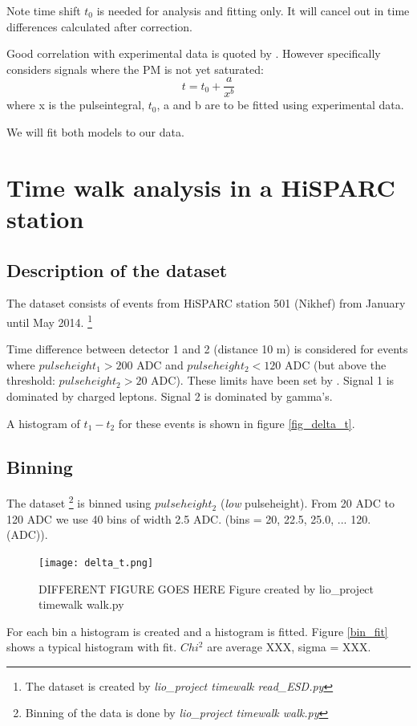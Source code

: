 \documentclass[a4paper,11pt]{article}
\begin{document}
Note time shift $t_0$ is needed for analysis and fitting only. It will cancel out in time differences calculated after correction.

Good correlation with experimental data is quoted by \cite{Brown:1983ka}. However \cite{Smith:2002} specifically considers signals where the PM is not yet saturated:
\begin{equation}
t = t_0 + \frac{a}{x^b}
\end{equation}
where x is the pulseintegral, $t_0$, a and b are to be fitted using experimental data.

We will fit both models to our data.

\section{Time walk analysis in a HiSPARC station}
\subsection{Description of the dataset}
The dataset consists of events from HiSPARC station 501 (Nikhef) from January until May 2014. \footnote{The dataset is created by {\textit{lio\_project timewalk read\_ESD.py}}}

Time difference between detector 1 and 2 (distance 10 m) is considered for events where $pulseheight_1 > 200$ ADC and $pulseheight_2 < 120$ ADC (but above the threshold: $pulseheight_2 > 20$ ADC). These limits have been set by \cite{Pennink:2010}. Signal 1 is dominated by charged leptons. Signal 2 is dominated by gamma's.

A histogram of $t_1 - t_2 $ for these events is shown in figure \ref{fig_delta_t}.



\subsection{Binning}

The dataset \footnote{Binning of the data is done by {\textit{lio\_project timewalk walk.py}}}
is binned using $pulseheight_2$ (\textit{low} pulseheight). From 20 ADC to 120 ADC we use 40 bins of width 2.5 ADC. (bins = 20, 22.5, 25.0, ... 120. (ADC)).

\begin{figure}[h!]
  \centering
    \texttt{[image: delta\_t.png]}
  \caption{DIFFERENT FIGURE GOES HERE Figure created by lio\_project timewalk walk.py}
  \label{fig_bin}
\end{figure}

For each bin a histogram is created and a histogram is fitted. Figure \ref{bin_fit} shows a typical histogram with fit. $Chi^2$ are average XXX, sigma = XXX.



\printbibliography
\end{document}
